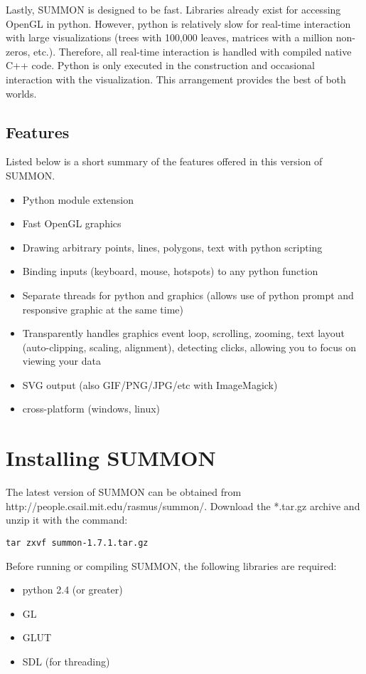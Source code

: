 \documentclass[12pt]{article}
\newcommand{\items}[1]{\begin{itemize} #1 \end{itemize}}
\newcommand{\codeblock}[1]{\vspace{.1in} {\tt #1} \vspace{.1in}}
\newcommand{\version}{1.7.1}
\begin{document}
Lastly, SUMMON is designed to be fast.  Libraries already exist for
accessing OpenGL in python.  However, python is relatively slow for real-time
interaction with large visualizations (trees with 100,000 leaves, matrices with
a million non-zeros, etc.).  Therefore, all real-time interaction is handled
with compiled native C++ code.  Python is only executed in the construction 
and occasional interaction with the visualization.  This arrangement provides 
the best of both worlds.




\subsection{Features}

Listed below is a short summary of the features offered in this version of
SUMMON.

\items{
    \item Python module extension
    \item Fast OpenGL graphics
    \item Drawing arbitrary points, lines, polygons, text with python scripting
    \item Binding inputs (keyboard, mouse, hotspots) to any python function 
    \item Separate threads for python and graphics (allows use of python prompt
          and responsive graphic at the same time)    
    \item Transparently handles graphics event loop, scrolling, zooming, text
          layout (auto-clipping, scaling, alignment), detecting clicks, allowing
          you to focus on viewing your data
    \item SVG output (also GIF/PNG/JPG/etc with ImageMagick)
    \item cross-platform (windows, linux)
}


\section{Installing SUMMON}
\label{sec:installing}

The latest version of SUMMON can be obtained from 
http://people.csail.mit.edu/rasmus/summon/.  Download the *.tar.gz archive and
unzip it with the command:

\codeblock{tar zxvf summon-\version.tar.gz}

Before running or compiling SUMMON, the following libraries are required:
\items {
    \item python 2.4 (or greater)
    \item GL   
    \item GLUT
    \item SDL (for threading)
}
\end{document}
